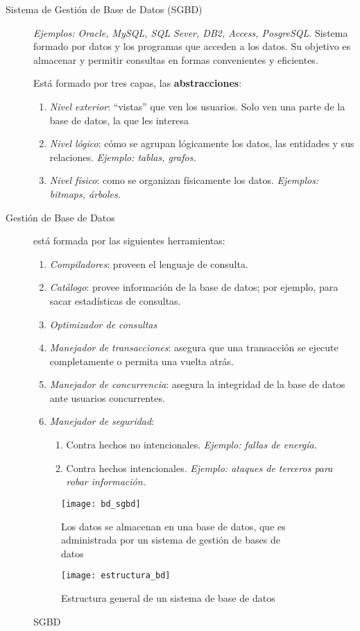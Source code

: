 \documentclass[a4paper, twoside]{article}
\begin{document}
\begin{description}
	\item[Sistema de Gestión de Base de Datos (SGBD)] \emph{Ejemplos: Oracle, MySQL, SQL Sever, DB2, Access, PosgreSQL}. Sistema formado por datos y los programas que acceden a los datos. Su objetivo es almacenar y permitir consultas en formas convenientes y eficientes.

	Está formado por tres capas, las \textbf{abstracciones}:
	\begin{enumerate}
		\item \emph{Nivel exterior}: ``vistas'' que ven los usuarios. Solo ven una parte de la base de datos, la que les interesa
		\item \emph{Nivel lógico}: cómo se agrupan lógicamente los datos, las entidades y sus relaciones. \emph{Ejemplo: tablas, grafos.}
		\item \emph{Nivel físico}: como se organizan físicamente los datos. \emph{Ejemplos: bitmaps, árboles.}
	\end{enumerate}

	\item[Gestión de Base de Datos] está formada por las siguientes herramientas:
	\begin{enumerate}
		\item \emph{Compiladores}: proveen el lenguaje de consulta.
		\item \emph{Catálogo}: provee información de la base de datos; por ejemplo, para sacar estadísticas de consultas.
		\item \emph{Optimizador de consultas}
		\item \emph{Manejador de transacciones}: asegura que una transacción se ejecute completamente o permita una vuelta atrás.
		\item \emph{Manejador de concurrencia}: asegura la integridad de la base de datos ante usuarios concurrentes.
		\item \emph{Manejador de seguridad}: 
		\begin{enumerate}
			\item Contra hechos no intencionales. \emph{Ejemplo: fallas de energía.}
			\item Contra hechos intencionales. \emph{Ejemplo: ataques de terceros para robar información.}
		\end{enumerate}
	\end{enumerate}
\end{description}

\begin{figure}[H]
	\centering
	\begin{subfigure}{0.45\textwidth}
		\texttt{[image: bd\_sgbd]}
		\caption{Los datos se almacenan en una base de datos, que es administrada por un sistema de gestión de bases de datos}
	\end{subfigure}
	\begin{subfigure}{0.45\textwidth}
		\centering
		\texttt{[image: estructura\_bd]}
		\caption{Estructura general de un sistema de base de datos}
	\end{subfigure}	
	\caption{SGBD}
\end{figure}
\end{document}
